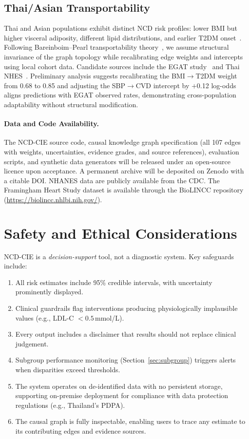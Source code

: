 \documentclass[runningheads]{llncs}
\begin{document}
\subsection{Thai/Asian Transportability}\label{sec:thai}

Thai and Asian populations exhibit distinct NCD risk profiles: lower
BMI but higher visceral adiposity, different lipid distributions, and
earlier T2DM onset~\cite{aekplakorn2011thai}.  Following
Bareinboim--Pearl transportability
theory~\cite{bareinboim2016causal}, we assume structural invariance
of the graph topology while recalibrating edge weights and intercepts
using local cohort data.  Candidate sources include the EGAT
study~\cite{sritara2003egat} and Thai NHES~\cite{aekplakorn2011thai}.
Preliminary analysis suggests recalibrating the BMI$\rightarrow$T2DM
weight from 0.68 to 0.85 and adjusting the SBP$\rightarrow$CVD
intercept by $+$0.12 log-odds aligns predictions with EGAT observed
rates, demonstrating cross-population adaptability without structural
modification.

\paragraph{Data and Code Availability.}
The NCD-CIE source code, causal knowledge graph specification
(all 107 edges with weights, uncertainties, evidence grades, and
source references), evaluation scripts, and synthetic data generators
will be released under an open-source licence upon acceptance.
A permanent archive will be deposited on Zenodo with a citable DOI\@.
NHANES data are publicly available from the CDC\@.  The Framingham
Heart Study dataset is available through the BioLINCC repository
(\url{https://biolincc.nhlbi.nih.gov/}).

\section{Safety and Ethical Considerations}\label{sec:ethics}

NCD-CIE is a \emph{decision-support} tool, not a diagnostic system.
Key safeguards include:
\begin{enumerate}
\item All risk estimates include 95\% credible intervals, with
  uncertainty prominently displayed.
\item Clinical guardrails flag interventions producing physiologically
  implausible values (e.g., LDL-C $< 0.5$\,mmol/L).
\item Every output includes a disclaimer that results should not
  replace clinical judgement.
\item Subgroup performance monitoring (Section~\ref{sec:subgroup})
  triggers alerts when disparities exceed thresholds.
\item The system operates on de-identified data with no persistent
  storage, supporting on-premise deployment for compliance with data
  protection regulations (e.g., Thailand's PDPA).
\item The causal graph is fully inspectable, enabling users to trace
  any estimate to its contributing edges and evidence sources.
\end{enumerate}
\end{document}
